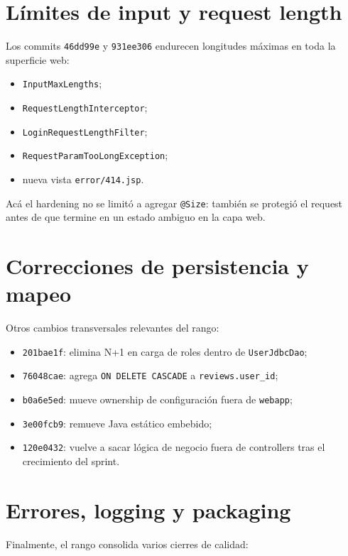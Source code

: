 \documentclass[11pt,a4paper]{report}
\newcommand{\commit}[1]{\texttt{#1}}
\newcommand{\code}[1]{\nolinkurl{#1}}
\begin{document}
\section{L\'imites de input y request length}

Los commits \commit{46dd99e} y \commit{931ee306} endurecen longitudes m\'aximas en toda la superficie web:

\begin{itemize}
  \item \code{InputMaxLengths};
  \item \code{RequestLengthInterceptor};
  \item \code{LoginRequestLengthFilter};
  \item \code{RequestParamTooLongException};
  \item nueva vista \code{error/414.jsp}.
\end{itemize}

Ac\'a el hardening no se limit\'o a agregar \code{@Size}: tambi\'en se protegi\'o el request antes de que termine en un estado ambiguo en la capa web.

\section{Correcciones de persistencia y mapeo}

Otros cambios transversales relevantes del rango:

\begin{itemize}
  \item \commit{201bae1f}: elimina N+1 en carga de roles dentro de \code{UserJdbcDao};
  \item \commit{76048cae}: agrega \code{ON DELETE CASCADE} a \code{reviews.user\_id};
  \item \commit{b0a6e5ed}: mueve ownership de configuraci\'on fuera de \code{webapp};
  \item \commit{3e00fcb9}: remueve Java est\'atico embebido;
  \item \commit{120e0432}: vuelve a sacar l\'ogica de negocio fuera de controllers tras el crecimiento del sprint.
\end{itemize}

\section{Errores, logging y packaging}

Finalmente, el rango consolida varios cierres de calidad:
\end{document}
